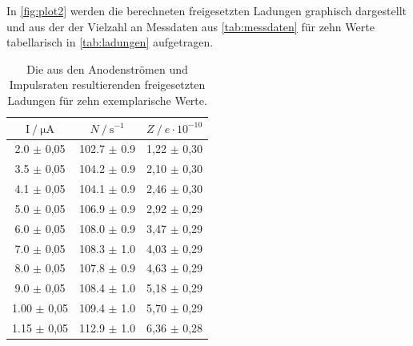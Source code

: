 In \autoref{fig:plot2} werden die berechneten freigesetzten Ladungen graphisch dargestellt und
aus der der Vielzahl an Messdaten aus \autoref{tab:messdaten} für zehn Werte tabellarisch in \autoref{tab:ladungen} aufgetragen.

\begin{table}
    \centering
    \caption{Die aus den Anodenströmen und Impulsraten resultierenden freigesetzten Ladungen für zehn exemplarische Werte.}
    \label{tab:ladungen}
    \begin{tabular}{c c c}
        \toprule
        $\mathrm{I} \mathbin{/} \unit{\micro\ampere}$ &
        $N \mathbin{/} \mathrm{s^{-1}}$ &
        $Z \mathbin{/} e \cdot 10^{-10}$ \\
        \midrule
        2.0  $\pm$ 0,05 & 102.7 $\pm$ 0.9 & 1,22 $\pm$ 0,30 \\
        3.5  $\pm$ 0,05 & 104.2 $\pm$ 0.9 & 2,10 $\pm$ 0,30 \\
        4.1  $\pm$ 0,05 & 104.1 $\pm$ 0.9 & 2,46 $\pm$ 0,30 \\
        5.0  $\pm$ 0,05 & 106.9 $\pm$ 0.9 & 2,92 $\pm$ 0,29 \\
        6.0  $\pm$ 0,05 & 108.0 $\pm$ 0.9 & 3,47 $\pm$ 0,29 \\
        7.0  $\pm$ 0,05 & 108.3 $\pm$ 1.0 & 4,03 $\pm$ 0,29 \\
        8.0  $\pm$ 0,05 & 107.8 $\pm$ 0.9 & 4,63 $\pm$ 0,29 \\
        9.0  $\pm$ 0,05 & 108.4 $\pm$ 1.0 & 5,18 $\pm$ 0,29 \\
        1.00 $\pm$ 0,05 & 109.4 $\pm$ 1.0 & 5,70 $\pm$ 0,29 \\
        1.15 $\pm$ 0,05 & 112.9 $\pm$ 1.0 & 6,36 $\pm$ 0,28 \\
        \bottomrule
    \end{tabular}
\end{table}

